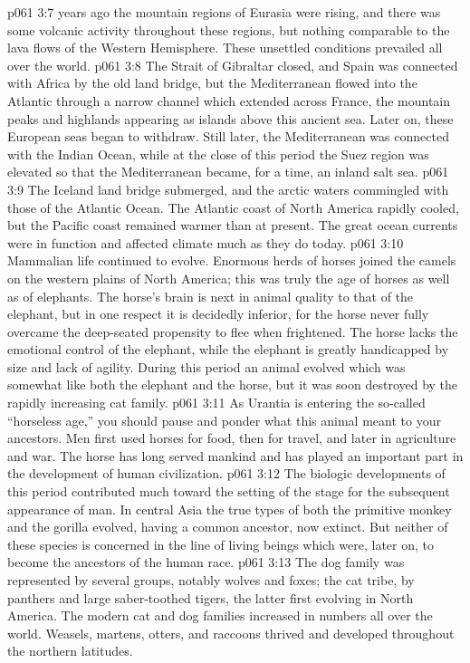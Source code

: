 \pc \vs p061 3:7  years ago the mountain regions of Eurasia were rising, and there was some volcanic activity throughout these regions, but nothing comparable to the lava flows of the Western Hemisphere. These unsettled conditions prevailed all over the world.
\vs p061 3:8 The Strait of Gibraltar closed, and Spain was connected with Africa by the old land bridge, but the Mediterranean flowed into the Atlantic through a narrow channel which extended across France, the mountain peaks and highlands appearing as islands above this ancient sea. Later on, these European seas began to withdraw. Still later, the Mediterranean was connected with the Indian Ocean, while at the close of this period the Suez region was elevated so that the Mediterranean became, for a time, an inland salt sea.
\vs p061 3:9 The Iceland land bridge submerged, and the arctic waters commingled with those of the Atlantic Ocean. The Atlantic coast of North America rapidly cooled, but the Pacific coast remained warmer than at present. The great ocean currents were in function and affected climate much as they do today.
\vs p061 3:10 Mammalian life continued to evolve. Enormous herds of horses joined the camels on the western plains of North America; this was truly the age of horses as well as of elephants. The horse’s brain is next in animal quality to that of the elephant, but in one respect it is decidedly inferior, for the horse never fully overcame the deep\hyp{}seated propensity to flee when frightened. The horse lacks the emotional control of the elephant, while the elephant is greatly handicapped by size and lack of agility. During this period an animal evolved which was somewhat like both the elephant and the horse, but it was soon destroyed by the rapidly increasing cat family.
\pc \vs p061 3:11 As Urantia is entering the so\hyp{}called “horseless age,” you should pause and ponder what this animal meant to your ancestors. Men first used horses for food, then for travel, and later in agriculture and war. The horse has long served mankind and has played an important part in the development of human civilization.
\pc \vs p061 3:12 The biologic developments of this period contributed much toward the setting of the stage for the subsequent appearance of man. In central Asia the true types of both the primitive monkey and the gorilla evolved, having a common ancestor, now extinct. But neither of these species is concerned in the line of living beings which were, later on, to become the ancestors of the human race.
\vs p061 3:13 The dog family was represented by several groups, notably wolves and foxes; the cat tribe, by panthers and large saber\hyp{}toothed tigers, the latter first evolving in North America. The modern cat and dog families increased in numbers all over the world. Weasels, martens, otters, and raccoons thrived and developed throughout the northern latitudes.

